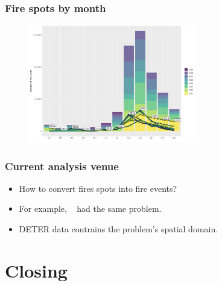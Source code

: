 \documentclass[aspectratio=169]{beamer}
\begin{document}

\begin{frame}
    \frametitle{Fire spots by month}
    \begin{figure}[h] 
    \includegraphics[width=0.65\textwidth]
        {./figures/plot_fire_spots_by_month.png}
    \end{figure}
\end{frame}

\begin{frame}
    \frametitle{Current analysis venue}
    \begin{itemize}
        \item How to convert fires spots into fire events?
        \item For example, ~\cite{andela2022} had the same problem.
        \item DETER data contrains the problem's spatial domain.
    \end{itemize}
\end{frame}


\section{Closing}
\end{document}
